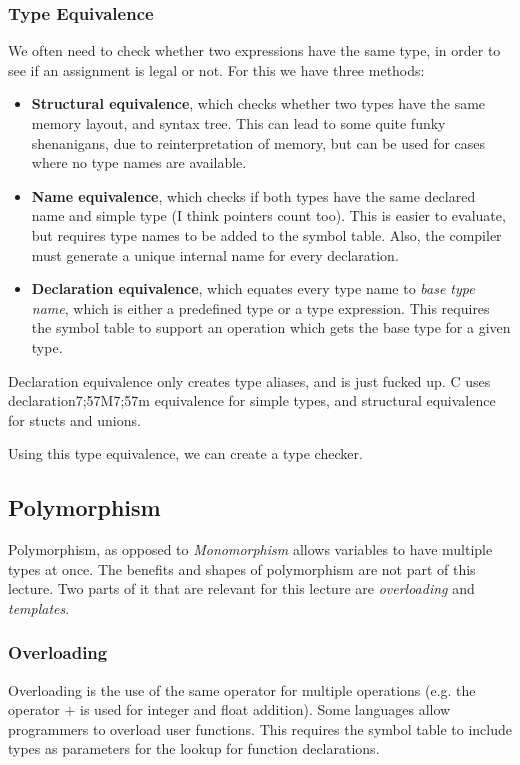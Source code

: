 \documentclass{article}
\begin{document}
\subsubsection{Type Equivalence}
We often need to check whether two expressions have the same type, in order to see if an assignment is legal or not.
For this we have three methods:
\begin{itemize}
	\item \textbf{Structural equivalence}, which checks whether two types have the same memory layout, and syntax tree.
		This can lead to some quite funky shenanigans, due to reinterpretation of memory, but can be used for cases where no type names are available.
	\item \textbf{Name equivalence}, which checks if both types have the same declared name and simple type (I think pointers count too).
		This is easier to evaluate, but requires type names to be added to the symbol table.
		Also, the compiler must generate a unique internal name for every declaration.
	\item \textbf{Declaration equivalence}, which equates every type name to \emph{base type name}, which is either a predefined type or a type expression.
		This requires the symbol table to support an operation which gets the base type for a given type.
\end{itemize}

\begin{keypointbox}
	Declaration equivalence only creates type aliases, and is just fucked up.
	C uses declaration7;57M7;57m equivalence for simple types, and structural equivalence for stucts and unions.
\end{keypointbox}

Using this type equivalence, we can create a type checker.

\subsection{Polymorphism}
Polymorphism, as opposed to \emph{Monomorphism} allows variables to have multiple types at once.
The benefits and shapes of polymorphism are not part of this lecture.
Two parts of it that are relevant for this lecture are \emph{overloading} and \emph{templates}.

\subsubsection{Overloading}
Overloading is the use of the same operator for multiple operations (e.g. the operator $+$ is used for integer and float addition).
Some languages allow programmers to overload user functions.
This requires the symbol table to include types as parameters for the lookup for function declarations.
\end{document}
